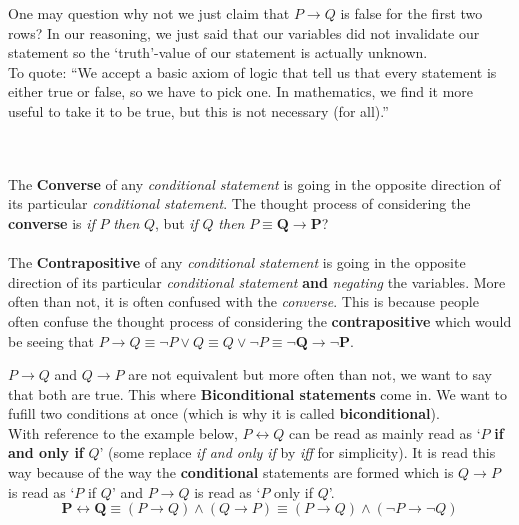 \documentclass[../setup.tex]{subfiles}
\begin{document}
\begin{remark}
One may question why not we just claim that $P\rightarrow Q$ is false for the first two rows? In our reasoning, we just said that our variables did not invalidate our statement so the `truth'-value of our statement is actually unknown. \\ To quote: ``We accept a basic axiom of logic that tell us that every statement is either true or false, so we have to pick one. In mathematics, we find it more useful to take it to be true, but this is not necessary (for all).'' 
\end{remark}
\phantom \\ \\
The \textbf{Converse} of any \textit{conditional statement} is going in the opposite direction of its particular \textit{conditional statement}. The thought process of considering the \textbf{converse} is \textit{if} $P$ \textit{then} $Q$, but \textit{if} $Q$ \textit{then} $P \equiv \boldsymbol{Q \rightarrow P}$?\\
\\
The \textbf{Contrapositive} of any \textit{conditional statement} is going in the opposite direction of its particular \textit{conditional statement} \textbf{and} \textit{negating} the variables. More often than not, it is often confused with the \textit{converse}. This is because people often confuse the thought process of considering the \textbf{contrapositive} which would be seeing that $P \rightarrow Q \equiv \lnot P\lor Q \equiv Q \lor\lnot P \equiv \boldsymbol{\lnot Q \rightarrow \lnot P}$. 

\begin{theorem}
$P \rightarrow Q$ and $Q \rightarrow P$ are not equivalent but more often than not, we want to say that both are true. This where \textbf{Biconditional statements} come in. We want to fufill two conditions at once (which is why it is called \textbf{biconditional}). \\
With reference to the example below, $P \longleftrightarrow Q$ can be read as mainly read as `$P$ \textbf{if and only if} $Q$' (some replace \textit{if and only if} by \textit{iff} for simplicity). It is read this way because of the way the \textbf{conditional} statements are formed which is  $Q \rightarrow P$ is read as `$P$ if $Q$' and $P \rightarrow Q$ is read as `$P$ only if $Q$'.
\[ \boldsymbol{P \longleftrightarrow Q} \equiv (P \rightarrow Q) \land (Q \rightarrow P) \equiv (P \rightarrow Q) \land (\lnot P \rightarrow \lnot Q)\]
\end{theorem}
\end{document}
